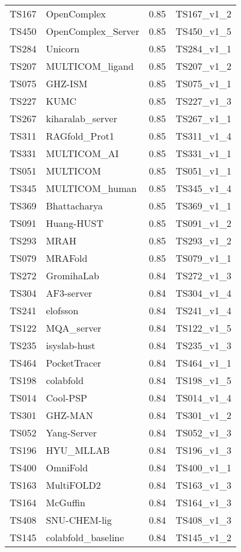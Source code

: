 \begin{longtable}{llll}
TS167 & OpenComplex & 0.85 & TS167\_v1\_2 \\ 
TS450 & OpenComplex\_Server & 0.85 & TS450\_v1\_5 \\ 
TS284 & Unicorn & 0.85 & TS284\_v1\_1 \\ 
TS207 & MULTICOM\_ligand & 0.85 & TS207\_v1\_2 \\ 
TS075 & GHZ-ISM & 0.85 & TS075\_v1\_1 \\ 
TS227 & KUMC & 0.85 & TS227\_v1\_3 \\ 
TS267 & kiharalab\_server & 0.85 & TS267\_v1\_1 \\ 
TS311 & RAGfold\_Prot1 & 0.85 & TS311\_v1\_4 \\ 
TS331 & MULTICOM\_AI & 0.85 & TS331\_v1\_1 \\ 
TS051 & MULTICOM & 0.85 & TS051\_v1\_1 \\ 
TS345 & MULTICOM\_human & 0.85 & TS345\_v1\_4 \\ 
TS369 & Bhattacharya & 0.85 & TS369\_v1\_1 \\ 
TS091 & Huang-HUST & 0.85 & TS091\_v1\_2 \\ 
TS293 & MRAH & 0.85 & TS293\_v1\_2 \\ 
TS079 & MRAFold & 0.85 & TS079\_v1\_1 \\ 
TS272 & GromihaLab & 0.84 & TS272\_v1\_3 \\ 
TS304 & AF3-server & 0.84 & TS304\_v1\_4 \\ 
TS241 & elofsson & 0.84 & TS241\_v1\_4 \\ 
TS122 & MQA\_server & 0.84 & TS122\_v1\_5 \\ 
TS235 & isyslab-hust & 0.84 & TS235\_v1\_3 \\ 
TS464 & PocketTracer & 0.84 & TS464\_v1\_1 \\ 
TS198 & colabfold & 0.84 & TS198\_v1\_5 \\ 
TS014 & Cool-PSP & 0.84 & TS014\_v1\_4 \\ 
TS301 & GHZ-MAN & 0.84 & TS301\_v1\_2 \\ 
TS052 & Yang-Server & 0.84 & TS052\_v1\_3 \\ 
TS196 & HYU\_MLLAB & 0.84 & TS196\_v1\_3 \\ 
TS400 & OmniFold & 0.84 & TS400\_v1\_1 \\ 
TS163 & MultiFOLD2 & 0.84 & TS163\_v1\_3 \\ 
TS164 & McGuffin & 0.84 & TS164\_v1\_3 \\ 
TS408 & SNU-CHEM-lig & 0.84 & TS408\_v1\_3 \\ 
TS145 & colabfold\_baseline & 0.84 & TS145\_v1\_2 \\ 

\end{longtable}
